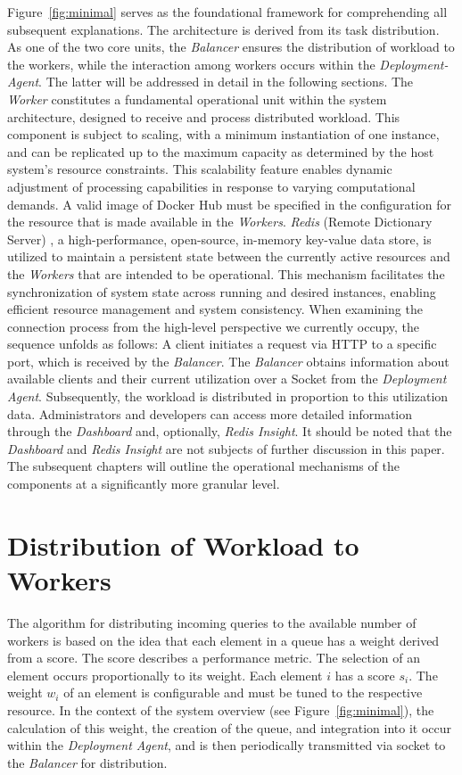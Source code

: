 \documentclass[twocolumn]{webofc}
\begin{document}
Figure~\ref{fig:minimal} serves as the foundational framework for comprehending all subsequent explanations. The architecture is derived from its task distribution. As one of the two core units, the \textit{Balancer} ensures the distribution of workload to the workers, while the interaction among workers occurs within the \textit{Deployment-Agent}. The latter will be addressed in detail in the following sections. The \textit{Worker} constitutes a fundamental operational unit within the system architecture, designed to receive and process distributed workload. This component is subject to scaling, with a minimum instantiation of one instance, and can be replicated up to the maximum capacity as determined by the host system's resource constraints. This scalability feature enables dynamic adjustment of processing capabilities in response to varying computational demands. A valid image of Docker Hub must be specified in the configuration for the resource that is made available in the \textit{Workers}.
\textit{Redis} (Remote Dictionary Server) \cite{redis_docs}, a high-performance, open-source, in-memory key-value data store, is utilized to maintain a persistent state between the currently active resources and the \textit{Workers} that are intended to be operational. This mechanism facilitates the synchronization of system state across running and desired instances, enabling efficient resource management and system consistency. When examining the connection process from the high-level perspective we currently occupy, the sequence unfolds as follows: A client initiates a request via HTTP to a specific port, which is received by the \textit{Balancer}. The \textit{Balancer} obtains information about available clients and their current utilization over a Socket from the \textit{Deployment Agent}. Subsequently, the workload is distributed in proportion to this utilization data.
Administrators and developers can access more detailed information through the \textit{Dashboard} and, optionally, \textit{Redis Insight}. It should be noted that the \textit{Dashboard} and \textit{Redis Insight} are not subjects of further discussion in this paper.
The subsequent chapters will outline the operational mechanisms of the components at a significantly more granular level.

\section{Distribution of Workload to Workers}
The algorithm for distributing incoming queries to the available number of workers is based on the idea that each element in a queue has a weight derived from a score. The score describes a performance metric. The selection of an element occurs proportionally to its weight. Each element \(i\) has a score \(s_i\). The weight \(w_i\) of an element is configurable and must be tuned to the respective resource. In the context of the system overview (see Figure~\ref{fig:minimal}), the calculation of this weight, the creation of the queue, and integration into it occur within the \textit{Deployment Agent}, and is then periodically transmitted via socket to the \textit{Balancer} for distribution.
\end{document}
